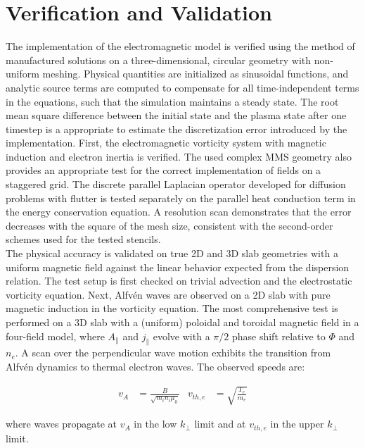 \chapter{Verification and Validation}
\label{chap:VV}


\begin{chaptersummarybox}
	The implementation of the electromagnetic model is verified using the method of manufactured solutions on a three-dimensional, circular geometry with non-uniform meshing. Physical quantities are initialized as sinusoidal functions, and analytic source terms are computed to compensate for all time-independent terms in the equations, such that the simulation maintains a steady state. The root mean square difference between the initial state and the plasma state after one timestep is a appropriate to estimate the discretization error introduced by the implementation. First, the electromagnetic vorticity system with magnetic induction and electron inertia is verified. The used complex MMS geometry also provides an appropriate test for the correct implementation of fields on a staggered grid. The discrete parallel Laplacian operator developed for diffusion problems with flutter is tested separately on the parallel heat conduction term in the energy conservation equation. A resolution scan demonstrates that the error decreases with the square of the mesh size, consistent with the second-order schemes used for the tested stencils. \\
	
	The physical accuracy is validated on true 2D and 3D slab geometries with a uniform magnetic field against the linear behavior expected from the dispersion relation. The test setup is first checked on trivial advection and the electrostatic vorticity equation. Next, Alfvén waves are observed on a 2D slab with pure magnetic induction in the vorticity equation. The most comprehensive test is performed on a 3D slab with a (uniform) poloidal and toroidal magnetic field in a four-field model, where $A_\parallel$ and $j_\parallel$ evolve with a $\pi/2$ phase shift relative to $\Phi$ and $n_e$. A scan over the perpendicular wave motion exhibits the transition from Alfvén dynamics to thermal electron waves. The observed speeds are:
	
	\begin{align*}
		v_A &= \frac{B}{\sqrt{m_in_i\mu_0}} & v_{th,e} &= \sqrt{\frac{T_e}{m_e}}
	\end{align*} 
	
	where waves propagate at $v_A$ in the low $k_\perp$ limit and at $v_{th,e}$ in the upper $k_\perp$ limit.
	
\end{chaptersummarybox}

